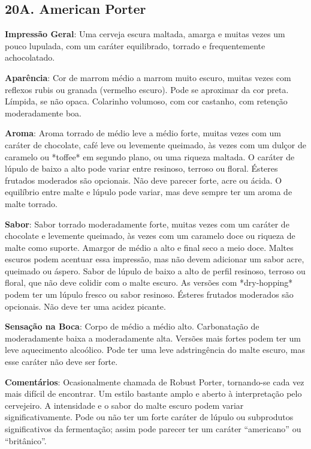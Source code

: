 \subsection*{20A. American Porter}

\textbf{Impressão Geral}: Uma cerveja escura maltada, amarga e muitas vezes um pouco lupulada, com um caráter equilibrado, torrado e frequentemente achocolatado.

\textbf{Aparência}: Cor de marrom médio a marrom muito escuro, muitas vezes com reflexos rubis ou granada (vermelho escuro). Pode se aproximar da cor preta. Límpida, se não opaca. Colarinho volumoso, com cor castanho, com retenção moderadamente boa.

\textbf{Aroma}: Aroma torrado de médio leve a médio forte, muitas vezes com um caráter de chocolate, café leve ou levemente queimado, às vezes com um dulçor de caramelo ou *toffee* em segundo plano, ou uma riqueza maltada. O caráter de lúpulo de baixo a alto pode variar entre resinoso, terroso ou floral. Ésteres frutados moderados são opcionais. Não deve parecer forte, acre ou ácida. O equilíbrio entre malte e lúpulo pode variar, mas deve sempre ter um aroma de malte torrado.

\textbf{Sabor}: Sabor torrado moderadamente forte, muitas vezes com um caráter de chocolate e levemente queimado, às vezes com um caramelo doce ou riqueza de malte como suporte. Amargor de médio a alto e final seco a meio doce. Maltes escuros podem acentuar essa impressão, mas não devem adicionar um sabor acre, queimado ou áspero. Sabor de lúpulo de baixo a alto de perfil resinoso, terroso ou floral, que não deve colidir com o malte escuro. As versões com *dry-hopping* podem ter um lúpulo fresco ou sabor resinoso. Ésteres frutados moderados são opcionais. Não deve ter uma acidez picante.

\textbf{Sensação na Boca}: Corpo de médio a médio alto. Carbonatação de moderadamente baixa a moderadamente alta. Versões mais fortes podem ter um leve aquecimento alcoólico. Pode ter uma leve adstringência do malte escuro, mas esse caráter não deve ser forte.

\textbf{Comentários}: Ocasionalmente chamada de Robust Porter, tornando-se cada vez mais difícil de encontrar. Um estilo bastante amplo e aberto à interpretação pelo cervejeiro. A intensidade e o sabor do malte escuro podem variar significativamente. Pode ou não ter um forte caráter de lúpulo ou subprodutos significativos da fermentação; assim pode parecer ter um caráter “americano” ou “britânico”.

